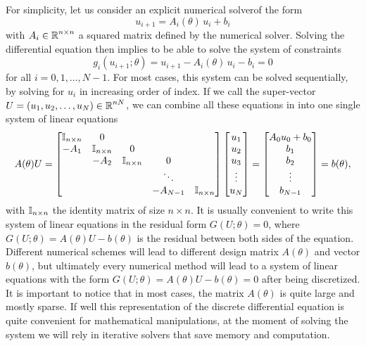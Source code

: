 For simplicity, let us consider an explicit numerical solverof the form 
\begin{equation}
    u_{i+1} = A_i (\theta) \, u_i + b_i
\end{equation}
with $A_i \in \operatorname{\mathbb{R}}^{n \times n}$ a squared matrix defined by the numerical solver. 
Solving the differential equation then implies to be able to solve the system of constraints 
\begin{equation}
    g_i (u_{i+1}; \theta) = u_{i+1} - A_i (\theta) \, u_i - b_i = 0
\end{equation}
for all $i=0, 1, \ldots, N-1$. 
For most cases, this system can be solved sequentially, by solving for $u_i$ in increasing order of index. 
If we call the super-vector $U = (u_1, u_2, \ldots, u_N) \in \operatorname{\mathbb{R}}^{nN}$, we can combine all these equations in into one single system of linear equations 
\begin{equation}
    A(\theta) U 
    = 
    \begin{bmatrix}
        \operatorname{\mathbb{I}}_{n \times n} & 0 &   &  & \\
        -A_1 & \operatorname{\mathbb{I}}_{n \times n} & 0 &  &  \\
          & -A_2 & \operatorname{\mathbb{I}}_{n \times n} & 0 &  \\
         &  &   & \ddots &   \\
         &  &  & -A_{N-1} & \operatorname{\mathbb{I}}_{n \times n}
    \end{bmatrix}
    \begin{bmatrix}
        u_1 \\
        u_2 \\
        u_3 \\
        \vdots \\
        u_N
    \end{bmatrix}
    = 
    \begin{bmatrix}
        A_0 u_0 + b_0 \\
        b_1 \\
        b_2 \\
        \vdots \\
        b_{N-1}
    \end{bmatrix}
    = 
    b(\theta), 
\end{equation}
with $\operatorname{\mathbb{I}}_{n \times n}$ the identity matrix of size $n \times n$.
It is usually convenient to write this system of linear equations in the residual form $G(U; \theta) = 0$, where $G(U; \theta) = A(\theta) U - b(\theta)$ is the residual between both sides of the equation. 
Different numerical schemes will lead to different design matrix $A(\theta)$ and vector $b(\theta)$, but ultimately every numerical method will lead to a system of linear equations with the form $G(U; \theta) = A(\theta) U - b(\theta) = 0$ after being discretized. 
It is important to notice that in most cases, the matrix $A(\theta)$ is quite large and mostly sparse. 
If well this representation of the discrete differential equation is quite convenient for mathematical manipulations, at the moment of solving the system we will rely in iterative solvers that save memory and computation. 

